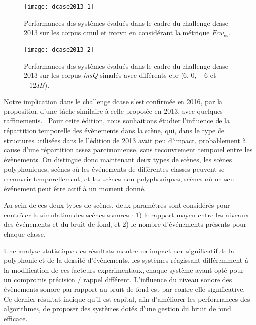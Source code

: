 \begin{figure}[t]
  \texttt{[image: dcase2013\_1]}
  \caption{Performances des systèmes évalués dans le cadre du challenge dcase 2013 sur les corpus qmul et irccyn en considérant la métrique $Fcw_{eb}$.}
  \label{fig:irccyn}
  \vspace{-4em}
\end{figure}

\begin{figure}[t]
  \begin{center}
    \texttt{[image: dcase2013\_2]}
    \caption{Performances des systèmes évalués dans le cadre du challenge dcase 2013 sur les corpus \emph{insQ} simulés avec différents ebr ($6$, $0$, $-6$ et $-12dB$).}
    \label{fig:ebr}
  \end{center}
  \vspace{-4em}
\end{figure}

Notre implication dans le challenge dcase s'est confirmée en 2016, par la proposition d'une tâche similaire à celle proposée en 2013, avec quelques raffinements.~\cite{mesa} Pour cette édition, nous souhaitions étudier l'influence de la répartition temporelle des évènements dans la scène, qui, dans le type de structures utilisées dans le l'édition de 2013 avait peu d'impact, probablement à cause d'une répartition assez parcimonieuse, sans recouvrement temporel entre les évènements. On distingue donc maintenant deux types de scènes, les scènes polyphoniques, scènes où les événements de différentes classes peuvent se recouvrir temporellement, et les scènes non-polyphoniques, scènes où un seul événement peut être actif à un moment donné.

Au sein de ces deux types de scènes, deux paramètres sont considérés pour contrôler la simulation des scènes sonores : 1) le rapport moyen entre les niveaux des événements et du bruit de fond, et 2) le nombre d'événements présents pour chaque classe.

Une analyse statistique des résultats\cite{lafayhal-01635414} montre un impact non significatif de la polyphonie et de la densité d'évènements, les systèmes réagissant différemment à la modification de ces facteurs expérimentaux, chaque système ayant opté pour un compromis précision / rappel différent. L'influence du niveau sonore des évènements sonore par rapport au bruit de fond est par contre elle significative. Ce dernier résultat indique qu'il est capital, afin d'améliorer les performances des algorithmes, de proposer des systèmes dotés d'une gestion du bruit de fond efficace.

